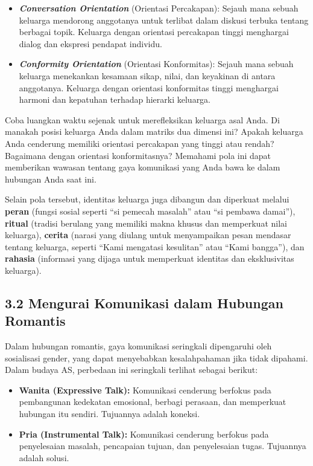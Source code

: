 \documentclass[
  letterpaper,
  DIV=11,
  numbers=noendperiod]{scrreprt}
\providecommand{\tightlist}{%
  \setlength{\itemsep}{0pt}\setlength{\parskip}{0pt}}
\begin{document}
\begin{itemize}
\tightlist
\item
  \emph{\textbf{Conversation Orientation}} (Orientasi Percakapan):
  Sejauh mana sebuah keluarga mendorong anggotanya untuk terlibat dalam
  diskusi terbuka tentang berbagai topik. Keluarga dengan orientasi
  percakapan tinggi menghargai dialog dan ekspresi pendapat individu.
\item
  \emph{\textbf{Conformity Orientation}} (Orientasi Konformitas): Sejauh
  mana sebuah keluarga menekankan kesamaan sikap, nilai, dan keyakinan
  di antara anggotanya. Keluarga dengan orientasi konformitas tinggi
  menghargai harmoni dan kepatuhan terhadap hierarki keluarga.
\end{itemize}

Coba luangkan waktu sejenak untuk merefleksikan keluarga asal Anda. Di
manakah posisi keluarga Anda dalam matriks dua dimensi ini? Apakah
keluarga Anda cenderung memiliki orientasi percakapan yang tinggi atau
rendah? Bagaimana dengan orientasi konformitasnya? Memahami pola ini
dapat memberikan wawasan tentang gaya komunikasi yang Anda bawa ke dalam
hubungan Anda saat ini.

Selain pola tersebut, identitas keluarga juga dibangun dan diperkuat
melalui \textbf{peran} (fungsi sosial seperti ``si pemecah masalah''
atau ``si pembawa damai''), \textbf{ritual} (tradisi berulang yang
memiliki makna khusus dan memperkuat nilai keluarga), \textbf{cerita}
(narasi yang diulang untuk menyampaikan pesan mendasar tentang keluarga,
seperti ``Kami mengatasi kesulitan'' atau ``Kami bangga''), dan
\textbf{rahasia} (informasi yang dijaga untuk memperkuat identitas dan
eksklusivitas keluarga).

\subsection{\texorpdfstring{\textbf{3.2 Mengurai Komunikasi dalam
Hubungan
Romantis}}{3.2 Mengurai Komunikasi dalam Hubungan Romantis}}\label{mengurai-komunikasi-dalam-hubungan-romantis}

Dalam hubungan romantis, gaya komunikasi seringkali dipengaruhi oleh
sosialisasi gender, yang dapat menyebabkan kesalahpahaman jika tidak
dipahami. Dalam budaya AS, perbedaan ini seringkali terlihat sebagai
berikut:

\begin{itemize}
\tightlist
\item
  \textbf{Wanita (Expressive Talk):} Komunikasi cenderung berfokus pada
  pembangunan kedekatan emosional, berbagi perasaan, dan memperkuat
  hubungan itu sendiri. Tujuannya adalah koneksi.
\item
  \textbf{Pria (Instrumental Talk):} Komunikasi cenderung berfokus pada
  penyelesaian masalah, pencapaian tujuan, dan penyelesaian tugas.
  Tujuannya adalah solusi.
\end{itemize}
\end{document}
